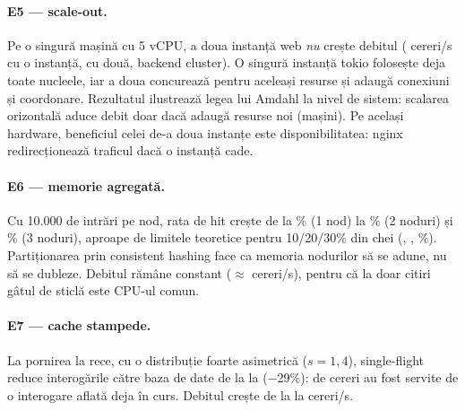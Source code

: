 \paragraph{E5 — scale-out.} Pe o singură mașină cu 5 vCPU, a doua instanță web \emph{nu} crește debitul
( cereri/s cu o instanță,  cu două, backend
cluster). O singură instanță tokio folosește deja toate nucleele, iar a doua concurează pentru aceleași
resurse și adaugă conexiuni și coordonare. Rezultatul ilustrează legea lui Amdahl la nivel de sistem: scalarea
orizontală aduce debit doar dacă adaugă resurse noi (mașini). Pe același hardware, beneficiul celei de-a doua
instanțe este disponibilitatea: nginx redirecționează traficul dacă o instanță cade.

\paragraph{E6 — memorie agregată.} Cu 10.000 de intrări pe nod, rata de hit crește de la
\% (1 nod) la \% (2 noduri) și \%
(3 noduri), aproape de limitele teoretice pentru 10/20/30\% din chei
(, , \%). Partiționarea prin
consistent hashing face ca memoria nodurilor să se adune, nu să se dubleze. Debitul rămâne constant
($\approx$ cereri/s), pentru că la doar citiri gâtul de sticlă este CPU-ul comun.

\paragraph{E7 — cache stampede.} La pornirea la rece, cu o distribuție foarte asimetrică ($s = 1{,}4$),
single-flight reduce interogările către baza de date de la  la 
($-$29\%):  de cereri au fost servite de o interogare aflată deja în curs. Debitul crește de la
 la  cereri/s.
